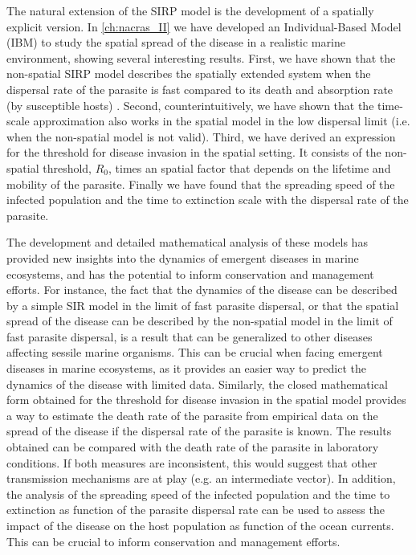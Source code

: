 The natural extension of the SIRP model is the development of a spatially
explicit version. In \cref{ch:nacras_II} we have developed an Individual-Based
Model (IBM) to study the spatial spread of the disease in a realistic marine
environment, showing several interesting results. First, we have shown that the
non-spatial SIRP model describes the spatially extended system when the
dispersal rate of the parasite is fast compared to its death and absorption
rate (by susceptible hosts) \cite{GimenezRomero_2022_RSos}. Second,
counterintuitively, we have shown that the time-scale approximation also works
in the spatial model in the low dispersal limit (i.e. when the non-spatial
model is not valid). Third, we have derived an expression for the threshold for
disease invasion in the spatial setting. It consists of the non-spatial
threshold, $R_0$, times an spatial factor that depends on the lifetime and
mobility of the parasite. Finally we have found that the spreading speed of
the infected population and the time to extinction scale with the dispersal
rate of the parasite.

The development and detailed mathematical analysis of these models has provided
new insights into the dynamics of emergent diseases in marine ecosystems, and
has the potential to inform conservation and management efforts. For instance,
the fact that the dynamics of the disease can be described by a simple SIR
model in the limit of fast parasite dispersal, or that the spatial spread of
the disease can be described by the non-spatial model in the limit of fast
parasite dispersal, is a result that can be generalized to other diseases
affecting sessile marine organisms. This can be crucial when facing emergent
diseases in marine ecosystems, as it provides an easier way to predict the
dynamics of the disease with limited data. Similarly, the closed mathematical
form obtained for the threshold for disease invasion in the spatial model
provides a way to estimate the death rate of the parasite from empirical data
on the spread of the disease if the dispersal rate of the parasite is known.
The results obtained can be compared with the death rate of the parasite in
laboratory conditions. If both measures are inconsistent, this would suggest
that other transmission mechanisms are at play (e.g. an intermediate vector).
In addition, the analysis of the spreading speed of the infected population and
the time to extinction as function of the parasite dispersal rate can be used
to assess the impact of the disease on the host population as function of the
ocean currents. This can be crucial to inform conservation and management
efforts.

